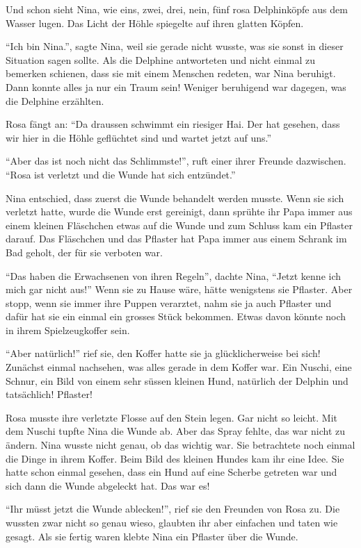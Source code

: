 Und schon sieht Nina, wie eins, zwei, drei, nein, fünf rosa Delphinköpfe aus dem Wasser lugen. Das Licht der Höhle spiegelte auf ihren glatten Köpfen. 

\enquote{Ich bin Nina.}, sagte Nina, weil sie gerade nicht wusste, was sie sonst in dieser Situation sagen sollte. Als die Delphine antworteten und nicht einmal zu bemerken schienen, dass sie mit einem Menschen redeten, war Nina beruhigt. Dann konnte alles ja nur ein Traum sein! Weniger beruhigend war dagegen, was die Delphine erzählten.

Rosa fängt an: \enquote{Da draussen schwimmt ein riesiger Hai. Der hat gesehen, dass wir hier in die Höhle geflüchtet sind und wartet jetzt auf uns.}

\enquote{Aber das ist noch nicht das Schlimmste!}, ruft einer ihrer Freunde dazwischen. \enquote{Rosa ist verletzt und die Wunde hat sich entzündet.}

Nina entschied, dass zuerst die Wunde behandelt werden musste. Wenn sie sich verletzt hatte, wurde die Wunde erst gereinigt, dann sprühte ihr Papa immer aus einem kleinen Fläschchen etwas auf die Wunde und zum Schluss kam ein Pflaster darauf. Das Fläschchen und das Pflaster hat Papa immer aus einem Schrank im Bad geholt, der für sie verboten war. 

\enquote{Das haben die Erwachsenen von ihren Regeln}, dachte Nina, \enquote{Jetzt kenne ich mich gar nicht aus!} Wenn sie zu Hause wäre, hätte wenigstens sie Pflaster. Aber stopp, wenn sie immer ihre Puppen verarztet, nahm sie ja auch Pflaster und dafür hat sie ein einmal ein grosses Stück bekommen. Etwas davon könnte noch in ihrem Spielzeugkoffer sein.

\enquote{Aber natürlich!} rief sie, den Koffer hatte sie ja glücklicherweise bei sich! Zunächst einmal nachsehen, was alles gerade in dem Koffer war. Ein Nuschi, eine Schnur, ein Bild von einem sehr süssen kleinen Hund, natürlich der Delphin und tatsächlich! Pflaster! 

Rosa musste ihre verletzte Flosse auf den Stein legen. Gar nicht so leicht. Mit dem Nuschi tupfte Nina die Wunde ab. Aber das Spray fehlte, das war nicht zu ändern. Nina wusste nicht genau, ob das wichtig war. Sie betrachtete noch einmal die Dinge in ihrem Koffer. Beim Bild des kleinen Hundes kam ihr eine Idee. Sie hatte schon einmal gesehen, dass ein Hund auf eine Scherbe getreten war und sich dann die Wunde abgeleckt hat. Das war es!

\enquote{Ihr müsst jetzt die Wunde ablecken!}, rief sie den Freunden von Rosa zu. Die wussten zwar nicht so genau wieso, glaubten ihr aber einfachen und taten wie gesagt. Als sie fertig waren klebte Nina ein Pflaster über die Wunde.

